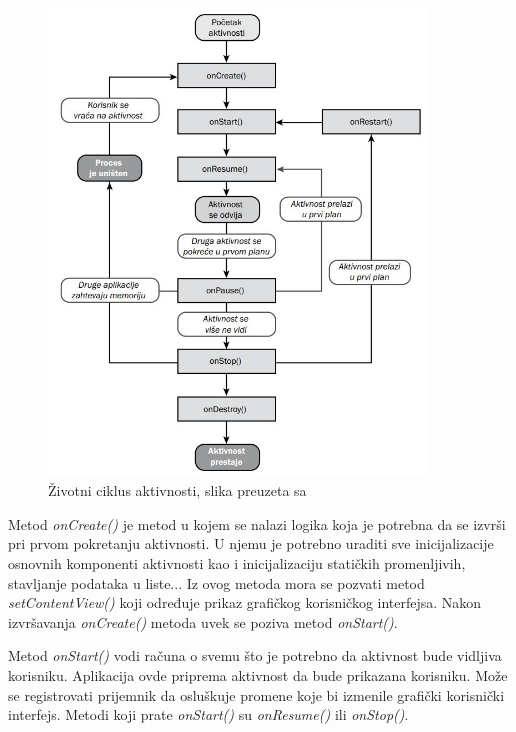 \documentclass[android.tex]{subfiles}
\begin{document}
\begin{figure}[!ht]
  \centering
  \includegraphics[width=0.9\textwidth]{Android/lifecycle-srpski.jpg}
  \caption{Životni ciklus aktivnosti, slika preuzeta sa \cite{sajt:zivotniCiklusSlika}}
  \label{fig:zivotniCiklus}
\end{figure}


Metod \textit{onCreate()} je metod u kojem se nalazi logika koja je potrebna da se izvrši pri prvom pokretanju aktivnosti. U njemu je potrebno uraditi sve inicijalizacije osnovnih komponenti aktivnosti kao i inicijalizaciju statičkih promenljivih, stavljanje podataka u liste... Iz ovog metoda mora se pozvati metod \textit{setContentView()} koji određuje prikaz grafičkog korisničkog interfejsa. Nakon izvršavanja \textit{onCreate() }metoda uvek se poziva metod \textit{onStart()}.

Metod \textit{onStart() }vodi računa o svemu što je potrebno da aktivnost bude vidljiva korisniku. Aplikacija ovde priprema aktivnost da bude prikazana korisniku. Može se registrovati prijemnik da osluškuje promene koje bi izmenile grafički korisnički interfejs. Metodi koji prate \textit{onStart()} su \textit{onResume() }ili \textit{onStop()}.
\end{document}
